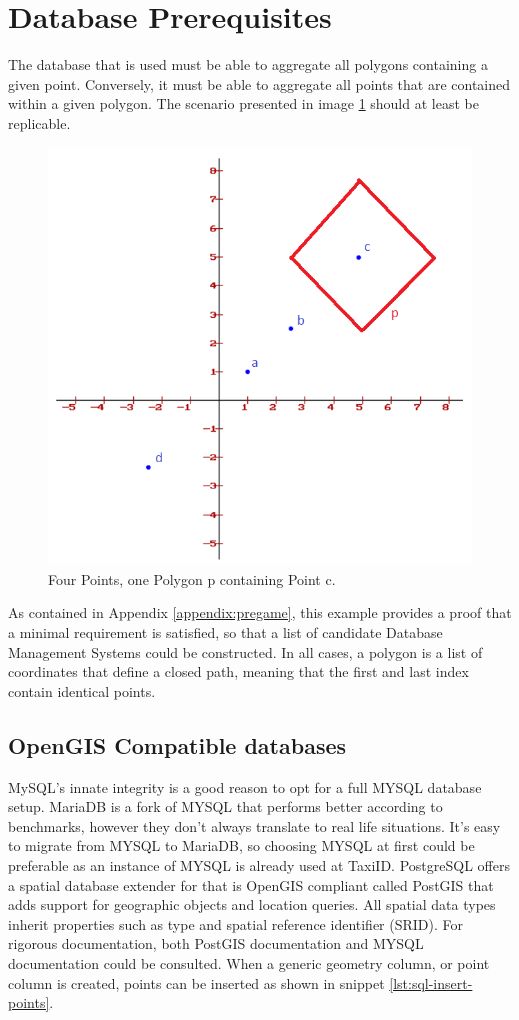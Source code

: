 %
\section{Database Prerequisites}
The database that is used must be able to aggregate all polygons containing a given point. Conversely, it must be able to aggregate all points that are contained within a given polygon. The scenario presented in image \ref{fig:square} should at least be replicable.

\begin{figure}[htbp!]
	\centering
	\includegraphics[width=.5\textwidth]{Square}
	\caption[Square]{Four Points, one Polygon p containing Point c.}
	\label{fig:square}
\end{figure}

As contained in Appendix \ref{appendix:pregame}, this example provides a proof that a minimal requirement is satisfied, so that a list of candidate Database Management Systems could be constructed. In all cases, a polygon is a list of coordinates that define a closed path, meaning that the first and last index contain identical points.

\subsection{OpenGIS Compatible databases}
MySQL's innate integrity is a good reason to opt for a full MYSQL database setup. MariaDB is a fork of MYSQL that performs better according to benchmarks, however they don’t always translate to real life situations. It’s easy to migrate from MYSQL to MariaDB, so choosing MYSQL at first could be preferable as an instance of MYSQL is already used at TaxiID. PostgreSQL offers a spatial database extender for that is OpenGIS compliant called PostGIS that adds support for geographic objects and location queries. All spatial data types inherit properties such as type and spatial reference identifier (SRID). For rigorous documentation, both PostGIS documentation \cite{PostGIS} and MYSQL documentation \cite{MySQL} could be consulted. When a generic geometry column, or point column is created, points can be inserted as shown in snippet \ref{lst:sql-insert-points}.

